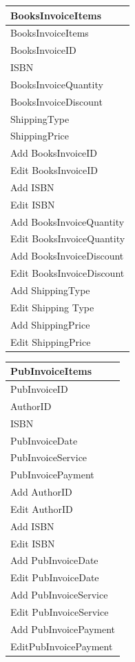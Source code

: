 \begin{tabular}{|p{4cm}|}
    \hline
    \textbf{BooksInvoiceItems} \\ \hline
    BooksInvoiceItems \\ BooksInvoiceID \\ ISBN \\ BooksInvoiceQuantity \\ BooksInvoiceDiscount \\ ShippingType \\ ShippingPrice \\ \hline
    Add BooksInvoiceID \\ Edit BooksInvoiceID \\ Add ISBN \\ Edit ISBN \\ Add BooksInvoiceQuantity \\ Edit BooksInvoiceQuantity \\ Add BooksInvoiceDiscount \\ Edit BooksInvoiceDiscount \\ Add ShippingType \\ Edit Shipping Type \\ Add ShippingPrice \\ Edit ShippingPrice \\ \hline
\end{tabular}

\begin{tabular}{|p{4cm}|}
    \hline
    \textbf{PubInvoiceItems} \\ \hline
    PubInvoiceID \\ AuthorID \\ ISBN \\ PubInvoiceDate \\ PubInvoiceService \\ PubInvoicePayment \\ \hline
    Add AuthorID \\ Edit AuthorID \\ Add ISBN \\ Edit ISBN \\ Add PubInvoiceDate \\ Edit PubInvoiceDate \\ Add PubInvoiceService \\ Edit PubInvoiceService \\ Add PubInvoicePayment \\ EditPubInvoicePayment \\ \hline
\end{tabular}

